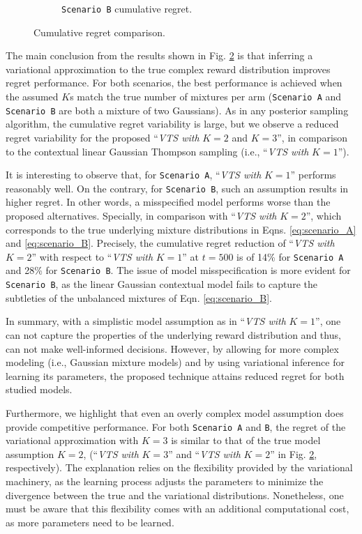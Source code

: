 \documentclass[10pt]{article}
\newcommand{\ie}{i.e., }
\begin{document}
\begin{figure}[!h]
\begin{subfigure}[b]{0.49\textwidth}
		\caption{\texttt{Scenario B} cumulative regret.}
		\label{fig:model_b_cumregret}
	\end{subfigure}
	\caption{Cumulative regret comparison.}
	\label{fig:cumregret_comparison}
\end{figure}

The main conclusion from the results shown in Fig. \ref{fig:cumregret_comparison} is that inferring a variational approximation to the true complex reward distribution improves regret performance. For both scenarios, the best performance is achieved when the assumed $K$s match the true number of mixtures per arm (\texttt{Scenario A} and \texttt{Scenario B} are both a mixture of two Gaussians). As in any posterior sampling algorithm, the cumulative regret variability is large, but we observe a reduced regret variability for the proposed ``\textit{VTS with }$K=2$ and $K=3$'', in comparison to the contextual linear Gaussian Thompson sampling (\ie ``\textit{VTS with }$K=1$'').

It is interesting to observe that, for \texttt{Scenario A}, ``\textit{VTS with }$K=1$'' performs reasonably well. On the contrary, for \texttt{Scenario B}, such an assumption results in higher regret. In other words, a misspecified model performs worse than the proposed alternatives. Specially, in comparison with ``\textit{VTS with }$K=2$'', which corresponds to the true underlying mixture distributions in Eqns. \ref{eq:scenario_A} and \ref{eq:scenario_B}. Precisely, the cumulative regret reduction of ``\textit{VTS with }$K=2$'' with respect to ``\textit{VTS with }$K=1$'' at $t=500$ is of 14\% for \texttt{Scenario A} and 28\% for \texttt{Scenario B}.
The issue of model misspecification is more evident for \texttt{Scenario B}, as the linear Gaussian contextual model fails to capture the subtleties of the unbalanced mixtures of Eqn. \ref{eq:scenario_B}.

In summary, with a simplistic model assumption as in ``\textit{VTS with }$K=1$'', one can not capture the properties of the underlying reward distribution and thus, can not make well-informed decisions. However, by allowing for more complex modeling (\ie Gaussian mixture models) and by using variational inference for learning its parameters, the proposed technique attains reduced regret for both studied models.

Furthermore, we highlight that even an overly complex model assumption does provide competitive performance. For both \texttt{Scenario A} and \texttt{B}, the regret of the variational approximation with $K=3$ is similar to that of the true model assumption $K=2$, (``\textit{VTS with }$K=3$'' and ``\textit{VTS with }$K=2$'' in Fig. \ref{fig:cumregret_comparison}, respectively). The explanation relies on the flexibility provided by the variational machinery, as the learning process adjusts the parameters to minimize the divergence between the true and the variational distributions. Nonetheless, one must be aware that this flexibility comes with an additional computational cost, as more parameters need to be learned.
\end{document}
